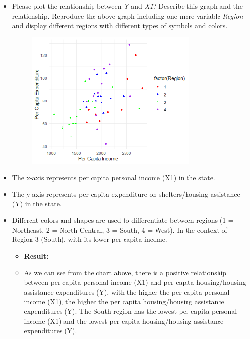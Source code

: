 \documentclass[12pt,letterpaper]{article}
\begin{document}
\begin{itemize}
\begin{itemize}
\end{itemize}
\item
Please plot the relationship between \emph{Y} and \emph{X1}? Describe this graph and the relationship. Reproduce the above graph including one more variable \emph{Region} and display different regions with different types of symbols and colors.
\vspace{.5cm}
 
\begin{figure}[H]
	\centering
	\includegraphics[width=0.8\textwidth]{4}
\end{figure}
\item The x-axis represents per capita personal income (X1) in the state.
\item The y-axis represents per capita expenditure on shelters/housing assistance (Y) in the state.
\item Different colors and shapes are used to differentiate between regions (1 = Northeast, 2 = North Central, 3 = South, 4 = West). In the context of Region 3 (South), with its lower per capita income.
\begin{itemize}
	\item\textbf{ Result:}
	\item As we can see from the chart above, there is a positive relationship between per capita personal income (X1) and per capita housing/housing assistance expenditures (Y), with the higher the per capita personal income (X1), the higher the per capita housing/housing assistance expenditures (Y). The South region has the lowest per capita personal income (X1) and the lowest per capita housing/housing assistance expenditures (Y).
\end{itemize}
\end{itemize}
\end{document}
